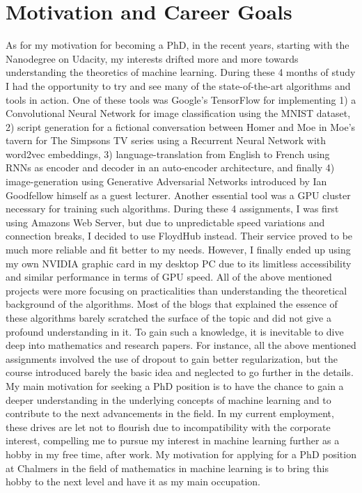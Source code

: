 \documentclass[12pt]{article}
\begin{document}
\section*{Motivation and Career Goals}
\label{sec:motivation}
As for my motivation for becoming a PhD, in the recent years, starting with the Nanodegree on Udacity, my interests drifted more and more towards understanding the theoretics of machine learning. During these 4 months of study I had the opportunity to try and see many of the state-of-the-art algorithms and tools in action. One of these tools was Google's TensorFlow for implementing 1) a Convolutional Neural Network for image classification using the MNIST dataset, 2) script generation for a fictional conversation between Homer and Moe in Moe's tavern for The Simpsons TV series using a Recurrent Neural Network with word2vec embeddings, 3) language-translation from English to French using RNNs as encoder and decoder in an auto-encoder architecture, and finally 4) image-generation using Generative Adversarial Networks introduced by Ian Goodfellow himself as a guest lecturer.
Another essential tool was a GPU cluster necessary for training such algorithms. During these 4 assignments, I was first using Amazons Web Server, but due to unpredictable speed variations and connection breaks, I decided to use FloydHub instead. Their service proved to be much more reliable and fit better to my needs. However, I finally ended up using my own NVIDIA graphic card in my desktop PC due to its limitless accessibility and similar performance in terms of GPU speed.
All of the above mentioned projects were more focusing on practicalities than understanding the theoretical background of the algorithms. Most of the blogs that explained the essence of these algorithms barely scratched the surface of the topic and did not give a profound understanding in it. To gain such a knowledge, it is inevitable to dive deep into mathematics and research papers. For instance, all the above mentioned assignments involved the use of dropout to gain better regularization, but the course introduced barely the basic idea and neglected to go further in the details. My main motivation for seeking a PhD position is to have the chance to gain a deeper understanding in the underlying concepts of machine learning and to contribute to the next advancements in the field. In my current employment, these drives are let not to flourish due to incompatibility with the corporate interest, compelling me to pursue my interest in machine learning further as a hobby in my free time, after work. My motivation for applying for a PhD position at Chalmers in the field of mathematics in machine learning is to bring this hobby to the next level and have it as my main occupation.
\end{document}
